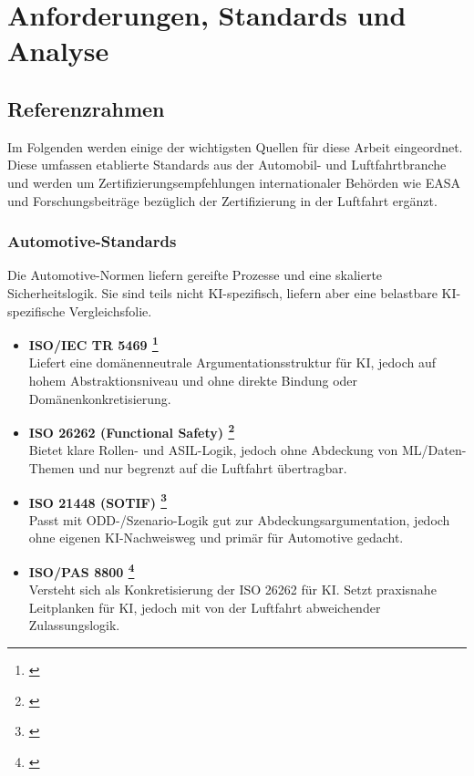 \part{Anforderungen, Standards und Analyse}
\chapter{Referenzrahmen}\label{chap:referenz}

Im Folgenden werden einige der wichtigsten Quellen für diese Arbeit eingeordnet. 
Diese umfassen etablierte Standards aus der Automobil- und Luftfahrtbranche und 
werden um Zertifizierungsempfehlungen internationaler Behörden wie EASA und 
Forschungsbeiträge bezüglich der Zertifizierung in der Luftfahrt ergänzt.

\section{Automotive-Standards}
Die Automotive-Normen liefern gereifte Prozesse und eine skalierte Sicherheitslogik. 
Sie sind teils nicht KI-spezifisch, liefern aber eine belastbare KI-spezifische Vergleichsfolie.

\medskip
\begin{itemize}
  \item \textbf{ISO/IEC TR 5469 \footnote{ \parencite{iso-iec-tr-5469-2024}}}\\
  Liefert eine domänenneutrale Argumentationsstruktur für KI, jedoch auf hohem Abstraktionsniveau und ohne direkte Bindung oder Domänenkonkretisierung.
  \item \textbf{ISO 26262 (Functional Safety) \footnote{ \parencite{iso-26262}}} \\
  Bietet klare Rollen- und ASIL-Logik, jedoch ohne Abdeckung von ML/Daten-Themen und nur begrenzt auf die Luftfahrt übertragbar.
  \item \textbf{ISO 21448 (SOTIF) \footnote{ \parencite{iso-21448-sotif}}} \\
  Passt mit ODD-/Szenario-Logik gut zur Abdeckungsargumentation, jedoch ohne eigenen KI-Nachweisweg und primär für Automotive gedacht.
  \item \textbf{ISO/PAS 8800 \footnote{ \parencite{iso-pas-8800-2024}}} \\
  Versteht sich als Konkretisierung der ISO 26262 für KI. Setzt praxisnahe Leitplanken für KI, jedoch mit von der Luftfahrt abweichender Zulassungslogik.
\end{itemize}


